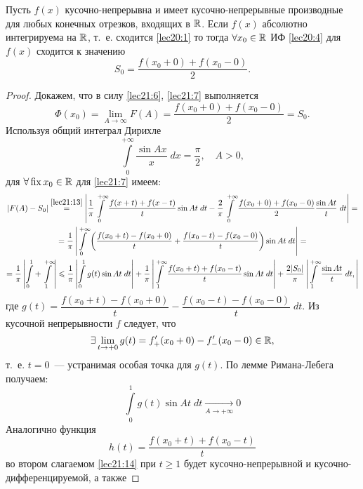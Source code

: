 \documentclass[../../main.tex]{subfiles}
\begin{document}
\begin{thm}[о сходимости ИФ]
	Пусть $ f(x) $ кусочно-непрерывна и имеет кусочно-непрерывные
	производные для любых конечных отрезков, входящих в $ \mathbb{R} $.
	Если $ f(x) $ абсолютно интегрируема на $ \mathbb{R} $, т.~е.
	сходится \eqref{lec20:1} то тогда 
	$ \forall x_0 \in \mathbb{R} $ ИФ \eqref{lec20:4} для $ f(x) $ сходится
	к значению 
	\begin{equation}
	\label{lec21:13}
	S_0 = \dfrac{f(x_0 + 0) + f(x_0 - 0)}{2}.
	\end{equation}
\end{thm}
\begin{proof}
	Докажем, что в силу \eqref{lec21:6}, \eqref{lec21:7} выполняется
	\[\Phi(x_0) = \lim\limits_{A \to \infty} F(A) = 
	\dfrac{f(x_0 + 0) + f(x_0 - 0)}{2} = S_0.\]
	Используя общий интеграл Дирихле 
	\[
	\int\limits_{0}^{+\infty} \dfrac{\sin Ax}{x}\;dx = 
	\dfrac{\pi}{2}, \quad A > 0,
	\]
	для $ \forall \operatorname{fix} x_0 \in \mathbb{R} $ для \eqref{lec21:7} имеем:
	\begin{equation}
	\label{lec21:14}
	\begin{gathered}
	|F(A) - S_0| \stackrel{\eqref{lec21:13}}{=}
	\left|
	\dfrac{1}{\pi}
	\int\limits_{0}^{+\infty}
	\dfrac{f(x + t) + f(x - t)}{t} \sin At\;dt - 
	\dfrac{2}{\pi} \int\limits_{0}^{+\infty} 
	\dfrac{f(x_0 + 0) + f(x_0 - 0)}{2} \dfrac{\sin At}{t}\;dt
	\right| = \\ =
	\dfrac{1}{\pi} \left|
	\int\limits_{0}^{+\infty} \left(
	\dfrac{f(x_0 + t) - f(x_0 + 0)}{t} +
	\dfrac{f(x_0 - t) - f(x_0 - 0) }{t}
	\right)
	\sin At\;dt
	\right| = \\ = \dfrac{1}{\pi}
	\left|
	\int\limits_{0}^{1} + \int\limits_{1}^{+\infty}
	\right| \leqslant \dfrac{1}{\pi}
	\left|
	\int\limits_{0}^{1} g(t) \sin At\;dt
	\right| + \dfrac{1}{\pi}
	\left|
	\int\limits_{1}^{+\infty} 
	\dfrac{f(x_0 + t) + f(x_0 - t)}{t} \sin At\;dt
	\right| + \dfrac{2|S_0|}{\pi}
	\left|
	\int\limits_{1}^{+\infty} \dfrac{\sin At}{t}\;dt,
	\right|
	\end{gathered}
	\end{equation} где $ g(t) = \dfrac{f(x_0 + t) - f(x_0 + 0)}{t} - 
	\dfrac{f(x_0 - t) - f(x_0 - 0)}{t}\;dt $.
	Из кусочной непрерывности $f$ следует, что
	\[
	\exists \lim\limits_{t \to +0} g(t) =
	f_+'(x_0 + 0) - f_-'(x_0 - 0) \in \mathbb{R},
	\] т.~е. $ t = 0 $~--- устранимая особая точка для $ g(t)$.
	По лемме Римана-Лебега получаем:
	\[
	\int\limits_{0}^{1} g(t) \sin At\;dt
	\underset{A \to +\infty}{\to} 0
	\]
	Аналогично функция \[
	h(t) = \dfrac{f(x_0 + t) + f(x_0 - t)}{t}
	\] во втором слагаемом \eqref{lec21:14} при 
	$ t \geq 1 $ будет кусочно-непрерывной и кусочно-дифференцируемой, а также

\end{proof}
\end{document}
